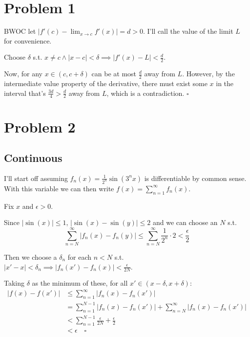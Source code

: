 \documentclass[12pt]{article}
\begin{document}
\section{Problem 1}

BWOC let $\left|f'(c)-\lim_{x \to c} f'(x)\right| = d > 0$.
I'll call the value of the limit $L$ for convenience.

Choose $\delta$ s.t. $x \ne c \land |x-c| < \delta \implies |f'(x)-L| < \frac{d}{2}$.

Now, for any $x \in (c, c+\delta)$ can be at most $\frac{d}{2}$ away from $L$.
However, by the intermediate value property of the derivative,
there must exist some $x$ in the interval that's $\frac{3d}{4} > \frac{d}{2}$
away from $L$, which is a contradiction. $\square$

\section{Problem 2}

\subsection{Continuous}

I'll start off assuming $f_n(x)=\frac{1}{2^n} \sin\left(3^nx\right)$
is differentiable by common sense.
With this variable we can then write $f(x)=\sum_{n=1}^{\infty} f_n(x)$.

Fix $x$ and $\epsilon > 0$.

Since $|\sin(x)| \le 1$, $|\sin(x)-\sin(y)| \le 2$ and we can choose an $N$ s.t.
\[\sum_{n=N}^{\infty} |f_n(x)-f_n(y)| \le \sum_{n=N}^{\infty} \frac{1}{2^n} \cdot 2 < \frac{\epsilon}{2}\]

Then we choose a $\delta_n$ for each $n < N$ s.t. $|x'-x| < \delta_n \implies |f_n(x')-f_n(x)| < \frac{\epsilon}{2N}$.

Taking $\delta$ as the minimum of these, for all $x' \in (x-\delta, x+\delta)$:
\begin{align*}
  |f(x)-f(x')|
   & \le \sum_{n=1}^{\infty} |f_n(x)-f_n(x')|                                   \\
   & = \sum_{n=1}^{N-1} |f_n(x)-f_n(x')| + \sum_{n=N}^{\infty} |f_n(x)-f_n(x')| \\
   & < \sum_{n=1}^{N-1} \frac{\epsilon}{2N} + \frac{\epsilon}{2}                \\
   & < \epsilon\quad\square
\end{align*}

\pagebreak
\end{document}
